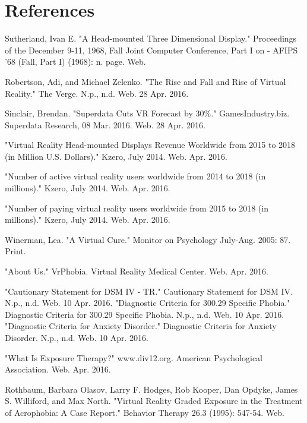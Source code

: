 \documentclass[a4paper,10pt]{article}
\begin{document}
\section{References}

\begin{thebibliography}{28}
Sutherland, Ivan E. "A Head-mounted Three Dimensional Display." Proceedings of the December 9-11, 1968, Fall Joint Computer Conference, Part I on - AFIPS '68 (Fall, Part I) (1968): n. page. Web.

Robertson, Adi, and Michael Zelenko. "The Rise and Fall and Rise of Virtual Reality." The Verge. N.p., n.d. Web. 28 Apr. 2016.



Sinclair, Brendan. "Superdata Cuts VR Forecast by 30\%." GamesIndustry.biz. Superdata Research, 08 Mar. 2016. Web. 28 Apr. 2016.

"Virtual Reality Head-mounted Displays Revenue Worldwide from 2015 to 2018 (in Million U.S. Dollars)." Kzero, July 2014. Web. Apr. 2016.

"Number of active virtual reality users worldwide from 2014 to 2018 (in millions)." Kzero, July 2014. Web. Apr. 2016.

"Number of paying virtual reality users worldwide from 2015 to 2018 (in millions)." Kzero, July 2014. Web. Apr. 2016.

Winerman, Lea. "A Virtual Cure." Monitor on Psychology July-Aug. 2005: 87. Print.


"About Us." VrPhobia. Virtual Reality Medical Center. Web. Apr. 2016.


"Cautionary Statement for DSM IV - TR." Cautionary Statement for DSM IV. N.p., n.d. Web. 10 Apr. 2016.
"Diagnostic Criteria for 300.29 Specific Phobia." Diagnostic Criteria for 300.29 Specific Phobia. N.p., n.d. Web. 10 Apr. 2016.
"Diagnostic Criteria for Anxiety Disorder." Diagnostic Criteria for Anxiety Disorder. N.p., n.d. Web. 10 Apr. 2016.

"What Is Exposure Therapy?" www.div12.org. American Psychological Association. Web. Apr. 2016.

Rothbaum, Barbara Olasov, Larry F. Hodges, Rob Kooper, Dan Opdyke, James S. Williford, and Max North. "Virtual Reality Graded Exposure in the Treatment of Acrophobia: A Case Report." Behavior Therapy 26.3 (1995): 547-54. Web.


\end{thebibliography}
\end{document}
